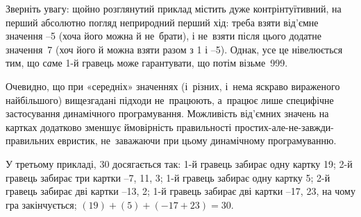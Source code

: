 Зверніть увагу: щойно розглянутий приклад містить дуже контрінтуїтивний, на перший абсолютно погляд неприродний перший хід: треба взяти від'ємне значення –5 (хоча його можна й не~брати), і не~взяти після цього додатне значення~7 (хоч його й можна взяти разом з 1 і –5). Однак, усе це нівелюється тим, що с{\it а}ме 1-й гравець може гарантувати, що потім візьме~999.

Очевидно, що при «середніх» значеннях (і~різних, і~нема яскраво вираженого найбільшого) вищезгадані підходи не~працюють, а~працює лише специфічне застосування динамічного програмування. Можливість від'ємних значень на картках додатково зменшує ймовірність правильності простих-але-не-завжди-правильних евристик, не~заважаючи при цьому динамічному програмуванню.

У третьому прикладі, 30 досягається так:
1-й гравець забирає одну картку 19;
2-й гравець забирає три картки –7, 11, 3;
1-й гравець забирає одну картку 5;
2-й гравець забирає дві картки –13, 2;
1-й гравець забирає дві картки –17, 23, на чому гра закінчується;
$(19)+(5)+(-17+23)=30$.